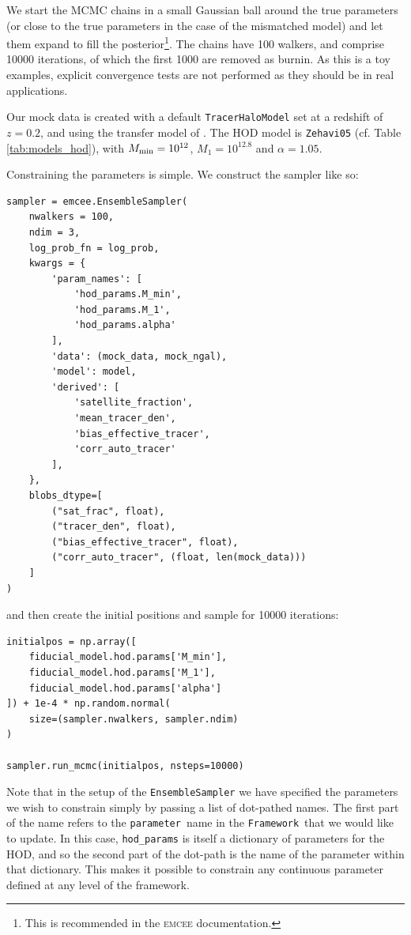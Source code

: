 \documentclass[5p,aas_macros]{elsarticle}
\newcommand{\framework}{\texttt{Framework}}
\newcommand{\parameter}{\texttt{parameter}}
\begin{document}
We start the MCMC chains in a small Gaussian ball around the true parameters (or close to the true parameters in the case of the mismatched model) and let them expand to fill the posterior\footnote{This is recommended in the \textsc{emcee} documentation.}. 
The chains have 100 walkers, and comprise 10000 iterations, of which the first 1000 are removed as burnin. 
As this is a toy examples, explicit convergence tests are not performed as they should be in real applications. 


Our mock data is created with a default \texttt{Tracer\-Halo\-Model} set at a redshift of $z=0.2$, and using the transfer model of \citet{Eisenstein1998}. The HOD model is \verb|Zehavi05| (cf. Table \ref{tab:models_hod}), with $M_{\rm min} = 10^{12}$, $M_1 = 10^{12.8}$ and $\alpha = 1.05$.

Constraining the parameters is simple. We construct the sampler like so:
\begin{verbatim}
sampler = emcee.EnsembleSampler(
    nwalkers = 100,
    ndim = 3,
    log_prob_fn = log_prob,
    kwargs = {
        'param_names': [
            'hod_params.M_min', 
            'hod_params.M_1', 
            'hod_params.alpha'
        ],  
        'data': (mock_data, mock_ngal), 
        'model': model,  
        'derived': [
            'satellite_fraction', 
            'mean_tracer_den',
            'bias_effective_tracer',
            'corr_auto_tracer'
        ],
    },
    blobs_dtype=[
        ("sat_frac", float), 
        ("tracer_den", float), 
        ("bias_effective_tracer", float),
        ("corr_auto_tracer", (float, len(mock_data)))
    ]
)
\end{verbatim}
and then create the initial positions and sample for 10000 iterations:
\begin{verbatim}
initialpos = np.array([
    fiducial_model.hod.params['M_min'], 
    fiducial_model.hod.params['M_1'],
    fiducial_model.hod.params['alpha']
]) + 1e-4 * np.random.normal(
    size=(sampler.nwalkers, sampler.ndim)
)

sampler.run_mcmc(initialpos, nsteps=10000)
\end{verbatim}
Note that in the setup of the \verb|EnsembleSampler| we have specified the parameters we wish to constrain simply by passing a list of dot-pathed names.
The first part of the name refers to the \parameter\ name in the \framework\ that we would like to update. In this case, \verb|hod_params| is itself a dictionary of parameters for the HOD, and so the second part of the dot-path is the name of the parameter within that dictionary. This makes it possible to constrain any continuous parameter defined at any level of the framework.
\end{document}
